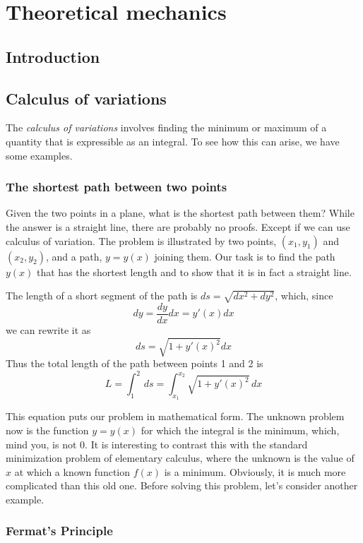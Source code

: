 \chapter{Theoretical mechanics}

\section{Introduction}

\section{Calculus of variations}
The \textit{calculus of variations} involves finding the minimum or maximum of a quantity that is expressible as an integral. To see how this can arise, we have some examples. 

\subsection{The shortest path between two points}

Given the two points in a plane, what is the shortest path between them? While the answer is a straight line, there are probably no proofs. Except if we can use calculus of variation. The problem is illustrated by two points, $(x_{1},y_{1})$ and $(x_{2},y_{2})$, and a path, $y=y(x)$ joining them. Our task is to find the path $y(x)$ that has the shortest length and to show that it is in fact a straight line. 

The length of a short segment of the path is $ds=\sqrt{ dx^{2} +dy^{2}}$, which, since $$dy=\frac{dy}{dx}dx=y'(x)dx$$
we can rewrite it as $$ds=\sqrt{ 1+y'(x)^{2} }dx$$
Thus the total length of the path between points 1 and 2 is $$L=\int_{1}^{2} \, ds = \int_{x_{1}}^{x_{2}} \sqrt{ 1+y'(x)^{2} } \, dx  $$


This equation puts our problem in mathematical form. The unknown problem now is the function $y=y(x)$ for which the integral is the minimum, which, mind you, is not 0. It is interesting to contrast this with the standard minimization problem of elementary calculus, where the unknown is the value of $x$ at which a known function $f(x)$ is a minimum. Obviously, it is much more complicated than this old one. Before solving this problem, let's consider another example. 

\subsection{Fermat's Principle}

